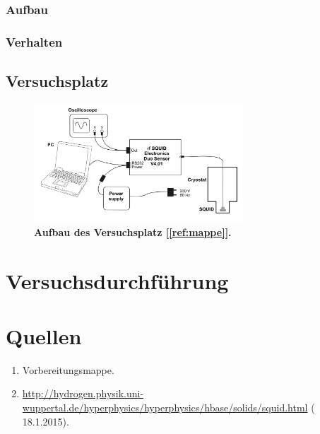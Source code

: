 \documentclass[a4paper,ngerman]{scrartcl}
\begin{document}
\subsubsection{Aufbau}

\subsubsection{Verhalten}

\subsection{Versuchsplatz}

\begin{figure}
\centering
\includegraphics[width=0.7\textwidth]{abbildungen/aufbau_versuchsplatz.png}
\caption[Versuchsplatz]{\textbf{Aufbau des Versuchsplatz [\ref{ref:mappe}].}}
\label{fig:Versuchsplatz}
\end{figure}



\section{Versuchsdurchführung}


\section{Quellen}
\begin{enumerate}
\item Vorbereitungsmappe.\label{ref:mappe}
\item \url{http://hydrogen.physik.uni-wuppertal.de/hyperphysics/hyperphysics/hbase/solids/squid.html} ( 18.1.2015).\label{ref:wuppertal}
\end{enumerate}
\end{document}
